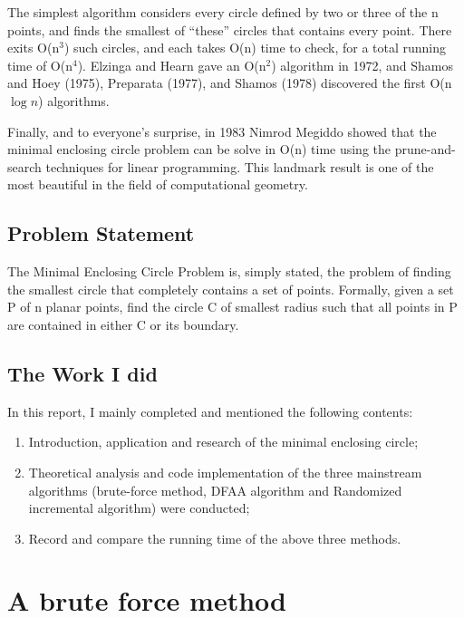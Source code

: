\documentclass[a4paper, 12pt]{article}
\begin{document}
The simplest algorithm considers every circle defined by two or three of the n points, and finds the smallest of “these” circles that contains every point. There exits O(n$^3$) such circles, and each takes O(n) time to check, for a total running time of O(n$^4$).  Elzinga and Hearn gave an O(n$^2$) algorithm in 1972, and Shamos and Hoey (1975), Preparata (1977), and Shamos (1978) discovered the first O(n$\log n$) algorithms.

Finally, and to everyone's surprise, in 1983 Nimrod Megiddo showed that the minimal enclosing circle problem can be solve in O(n) time using the prune-and-search techniques for linear programming. This landmark result is one of the most beautiful in the field of computational geometry.

\subsection{Problem Statement}
%
The Minimal Enclosing Circle Problem is, simply stated, the problem of finding the smallest circle that completely contains a set of points. Formally, given a set P of n planar points, find the circle C of smallest radius such that all points in P are contained in either C or its boundary.


\subsection{The Work I did}
%
In this report, I mainly completed and mentioned the following contents:
\begin{enumerate}
\item Introduction, application and research of the minimal enclosing circle;
\item Theoretical analysis and code implementation of the three mainstream algorithms (brute-force method, DFAA algorithm and Randomized incremental algorithm) were conducted;
\item Record and compare the running time of the above three methods.
\end{enumerate}

\newpage
\section{A brute force method}
\end{document}
